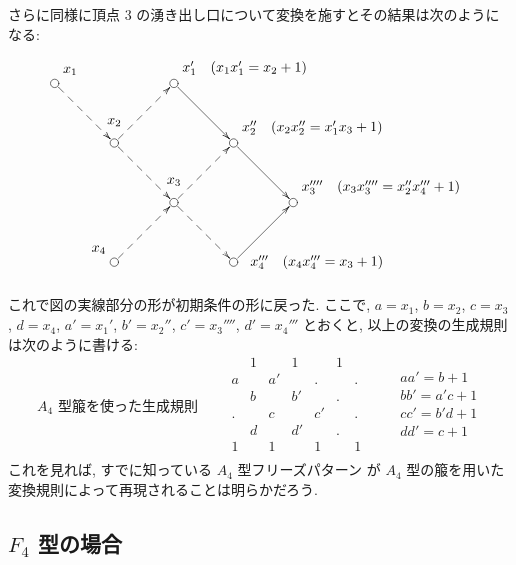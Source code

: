 \documentclass[12pt,twoside,dvipdfm]{jarticle}
\theoremstyle{definition} %
\theoremstyle{definition} %
\theoremstyle{definition} %
\numberwithin{theorem}{section}
\numberwithin{equation}{section}
\numberwithin{figure}{section}
\numberwithin{table}{section}
\begin{document}
さらに同様に頂点 $3$ の湧き出し口について変換を施すとその結果は次のようになる:
\[
\begin{xy}
 ( 0,45) *+[Fo]{}="1"*++!DL{x_1},
 (15,30) *+[Fo]{}="2"*++++!D{x_2},
 (30,15) *+[Fo]{}="3"*++++!D{x_3},
 (15, 0) *+[Fo]{}="4"*++!DR{x_4},
 (30,45) *+[Fo]{}="1'"*++!DL{x_1' \quad(x_1x_1'=x_2+1)},
 (45,30) *+[Fo]{}="2''"*++!DL{x_2'' \quad(x_2x_2''=x_1'x_3+1)},
 (60,15) *+[Fo]{}="3''''"*++!DL{x_3'''' \quad (x_3x_3''''=x_2''x_4'''+1)},
 (45, 0) *+[Fo]{}="4'''"*++++!L{x_4''' \quad(x_4x_4'''=x_3+1)},
 \ar@{-->}"1";"2",
 \ar@{-->}"2";"3",
 \ar@{-->}"4";"3",
 \ar@{-->}"2";"1'",
 \ar@{->}"1'";"2''",
 \ar@{-->}"3";"2''",
 \ar@{-->}"3";"4'''",
 \ar@{->}"2''";"3''''",
 \ar@{->}"4'''";"3''''"
\end{xy}
\]
これで図の実線部分の形が初期条件の形に戻った.
ここで, $a=x_1$, $b=x_2$, $c=x_3$, $d=x_4$, 
$a'=x_1'$,  $b'=x_2''$, $c'=x_3''''$, $d'=x_4'''$ とおくと, 
以上の変換の生成規則は次のように書ける:
\begin{equation*}
\text{$A_4$ 型箙を使った生成規則}
\qquad
\begin{array}{ccccccc}
   & 1 &   & 1 &   & 1 &   \\ \hline
 a &   & a'&   & . &   & . \\
   & b &   & b'&   & . &   \\
 . &   & c &   & c'&   & . \\
   & d &   & d'&   & . &   \\ \hline
 1 &   & 1 &   & 1 &   & 1 \\  
\end{array}
\qquad
\begin{array}{l}
 \\
    aa' =   b  +1 \\
    bb' = a'c  +1 \\
    cc' = b'd  +1 \\
    dd' = c    +1 \\
 \\
\end{array}
\end{equation*} 
これを見れば, すでに知っている $A_4$ 型フリーズパターン
が $A_4$ 型の箙を用いた変換規則によって再現されることは明らかだろう.


\subsection{$F_4$ 型の場合}
\end{document}
